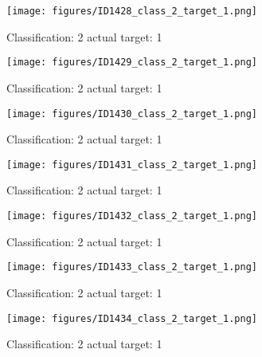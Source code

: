 \begin{figure}[h!]
\begin{center}
\texttt{[image: figures/ID1428\_class\_2\_target\_1.png]}
\end{center}
\caption{ Classification: 2 actual target: 1}
\label{fig:ID1428_class_2_target_1}
\end{figure}
\begin{figure}[h!]
\begin{center}
\texttt{[image: figures/ID1429\_class\_2\_target\_1.png]}
\end{center}
\caption{ Classification: 2 actual target: 1}
\label{fig:ID1429_class_2_target_1}
\end{figure}
\begin{figure}[h!]
\begin{center}
\texttt{[image: figures/ID1430\_class\_2\_target\_1.png]}
\end{center}
\caption{ Classification: 2 actual target: 1}
\label{fig:ID1430_class_2_target_1}
\end{figure}
\begin{figure}[h!]
\begin{center}
\texttt{[image: figures/ID1431\_class\_2\_target\_1.png]}
\end{center}
\caption{ Classification: 2 actual target: 1}
\label{fig:ID1431_class_2_target_1}
\end{figure}
\begin{figure}[h!]
\begin{center}
\texttt{[image: figures/ID1432\_class\_2\_target\_1.png]}
\end{center}
\caption{ Classification: 2 actual target: 1}
\label{fig:ID1432_class_2_target_1}
\end{figure}
\begin{figure}[h!]
\begin{center}
\texttt{[image: figures/ID1433\_class\_2\_target\_1.png]}
\end{center}
\caption{ Classification: 2 actual target: 1}
\label{fig:ID1433_class_2_target_1}
\end{figure}
\begin{figure}[h!]
\begin{center}
\texttt{[image: figures/ID1434\_class\_2\_target\_1.png]}
\end{center}
\caption{ Classification: 2 actual target: 1}
\label{fig:ID1434_class_2_target_1}
\end{figure}
